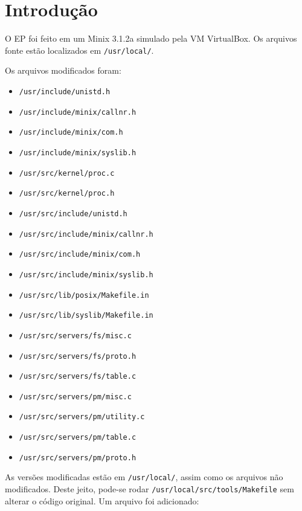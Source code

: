 \documentclass{amsart}
\title[]{\rule{10.5cm}{0.8pt}\\Exercício-Programa 2:\\
Escalonamento de Processos
\\\vspace{2mm}\footnotesize
  Sistemas Operacionais --- MAC0422\\\rule{10cm}{0.8pt}}
\author[]{Renato Lui Geh\\NUSP\@: 8536030\\
          Guilherme Freire\\NUSP\@: 7557373}
\theoremstyle{plain}
\newcommand{\code}[1]{\lstinline[mathescape=true]{#1}}
\begin{document}
\date{\today}
\maketitle

\section{Introdução}

O EP foi feito em um Minix 3.1.2a simulado pela VM VirtualBox. Os arquivos fonte estão localizados
em \code{/usr/local/}.

Os arquivos modificados foram:

\begin{itemize}
  \item \code{/usr/include/unistd.h}
  \item \code{/usr/include/minix/callnr.h}
  \item \code{/usr/include/minix/com.h}
  \item \code{/usr/include/minix/syslib.h}
  \item \code{/usr/src/kernel/proc.c}
  \item \code{/usr/src/kernel/proc.h}
  \item \code{/usr/src/include/unistd.h}
  \item \code{/usr/src/include/minix/callnr.h}
  \item \code{/usr/src/include/minix/com.h}
  \item \code{/usr/src/include/minix/syslib.h}
  \item \code{/usr/src/lib/posix/Makefile.in}
  \item \code{/usr/src/lib/syslib/Makefile.in}
  \item \code{/usr/src/servers/fs/misc.c}
  \item \code{/usr/src/servers/fs/proto.h}
  \item \code{/usr/src/servers/fs/table.c}
  \item \code{/usr/src/servers/pm/misc.c}
  \item \code{/usr/src/servers/pm/utility.c}
  \item \code{/usr/src/servers/pm/table.c}
  \item \code{/usr/src/servers/pm/proto.h}
\end{itemize}

As versões modificadas estão em \code{/usr/local/}, assim como os arquivos não modificados. Deste
jeito, pode-se rodar \code{/usr/local/src/tools/Makefile} sem alterar o código original. Um arquivo
foi adicionado:
\end{document}
